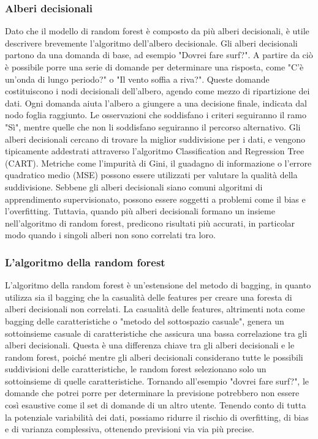 \subsubsection{Alberi decisionali}
Dato che il modello di random forest è composto da più alberi decisionali, è utile descrivere brevemente l'algoritmo dell'albero decisionale. 
Gli alberi decisionali partono da una domanda di base, ad esempio "Dovrei fare surf?". 
A partire da ciò è possibile porre una serie di domande per determinare una risposta, come "C'è un'onda di lungo periodo?" o "Il vento soffia a riva?". 
Queste domande costituiscono i nodi decisionali dell'albero, agendo come mezzo di ripartizione dei dati.
Ogni domanda aiuta l’albero a giungere a una decisione finale, indicata dal nodo foglia raggiunto. 
Le osservazioni che soddisfano i criteri seguiranno il ramo "Sì", mentre quelle che non li soddisfano seguiranno il percorso alternativo. 
Gli alberi decisionali cercano di trovare la miglior suddivisione per i dati, e vengono tipicamente addestrati attraverso l'algoritmo Classification and Regression Tree (CART). 
Metriche come l'impurità di Gini, il guadagno di informazione o l'errore quadratico medio (MSE) possono essere utilizzati per valutare la qualità della suddivisione.
Sebbene gli alberi decisionali siano comuni algoritmi di apprendimento supervisionato, possono essere soggetti a problemi come il bias e l'overfitting. 
Tuttavia, quando più alberi decisionali formano un insieme nell'algoritmo di random forest, predicono risultati più accurati, in particolar modo quando i singoli alberi non sono correlati tra loro.

\subsubsection{L'algoritmo della random forest}
L'algoritmo della random forest è un'estensione del metodo di bagging, in quanto utilizza sia il bagging che la casualità delle features per creare una foresta di alberi decisionali non correlati. 
La casualità delle features, altrimenti nota come bagging delle caratteristiche o "metodo del sottospazio casuale", genera un sottoinsieme casuale di caratteristiche che assicura una bassa correlazione tra gli alberi decisionali. 
Questa è una differenza chiave tra gli alberi decisionali e le random forest, poiché mentre gli alberi decisionali considerano tutte le possibili suddivisioni delle caratteristiche, le random forest selezionano solo un sottoinsieme di quelle caratteristiche.
Tornando all'esempio "dovrei fare surf?", le domande che potrei porre per determinare la previsione potrebbero non essere così esaustive come il set di domande di un altro utente. 
Tenendo conto di tutta la potenziale variabilità dei dati, possiamo ridurre il rischio di overfitting, di bias e di varianza complessiva, ottenendo previsioni via via più precise.

